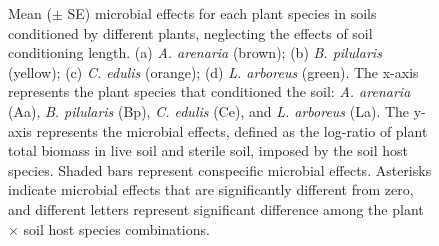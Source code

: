 \newpage
\begin{figure}[h]
	\centering
	\caption[Mean ($\pm$ SE) microbial effects for each plant species in soils conditioned by different plants, neglecting the effects of soil conditioning length.]
		{\hspace{1mm} 
		Mean ($\pm$ SE) microbial effects for each plant species in soils conditioned by different plants, neglecting the effects of soil conditioning length. 
		(a) \textit{A. arenaria} (brown); (b) \textit{B. pilularis} (yellow); (c) \textit{C. edulis} (orange); (d) \textit{L. arboreus} (green). 
		The x-axis represents the plant species that conditioned the soil: \textit{A. arenaria} (Aa), \textit{B. pilularis} (Bp), \textit{C. edulis} (Ce), and \textit{L. arboreus} (La). The y-axis represents the microbial effects, defined as the log-ratio of plant total biomass in live soil and sterile soil, imposed by the soil host species. 
		Shaded bars represent conspecific microbial effects. Asterisks indicate microbial effects that are significantly different from zero, and different letters represent significant difference among the plant $\times$ soil host species combinations.}
	\label{fig:PSFBar}
\end{figure}



